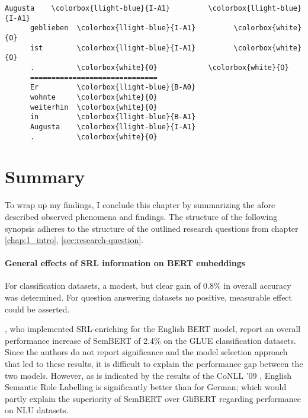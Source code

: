 {\begin{srl}[!h]
\begin{minipage}{0.45\linewidth}
\begin{BVerbatim}[commandchars=\\\{\}, fontsize=\footnotesize]
      Augusta    \colorbox{llight-blue}{I-A1}         \colorbox{llight-blue}{I-A1}
      geblieben  \colorbox{llight-blue}{I-A1}         \colorbox{white}{O}
      ist        \colorbox{llight-blue}{I-A1}         \colorbox{white}{O}
      .          \colorbox{white}{O}            \colorbox{white}{O}
      ==============================
      Er         \colorbox{llight-blue}{B-A0}
      wohnte     \colorbox{white}{O}
      weiterhin  \colorbox{white}{O}
      in         \colorbox{llight-blue}{B-A1}
      Augusta    \colorbox{llight-blue}{I-A1}
      .          \colorbox{white}{O}
    \end{BVerbatim}
  \end{minipage}
\end{srl}
\label{srl:ablation}
\endgroup


\newpage
\section{Summary}

To wrap up my findings, I conclude this chapter by summarizing the afore described observed
phenomena and findings. The structure of the following synopsis adheres to the structure of
the outlined research questions from chapter \ref{chap:1_intro}, \ref{sec:research-question}.


\paragraph*{General effects of SRL information on BERT embeddings}

For classification datasets, a modest, but clear gain of 0.8\% in overall accuracy
was determined. For question answering datasets no positive, measurable effect
could be asserted.

\cite{zhang2019semantics}, who implemented SRL-enriching for the English BERT model, report an
overall performance increase of SemBERT of 2.4\% on the GLUE classification datasets. Since the
authors do not report significance and the model selection approach that led to these results,
it is difficult to explain the performance gap between the two models. However, as is indicated
by the results of the CoNLL '09 \citep{hajivc2009conll} , English Semantic Role Labelling is
significantly better than for German; which would partly explain the superiority of SemBERT over
GliBERT regarding performance on NLU datasets.

}
